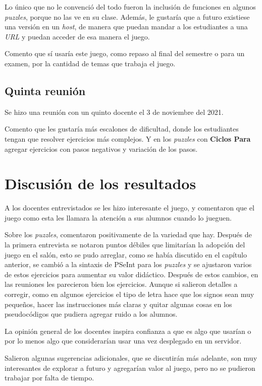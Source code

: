 Lo único que no le convenció del todo fueron la inclusión de funciones en algunos \textit{puzzles}, porque no las ve en su clase. Además, le gustaría que a futuro existiese una versión en un \textit{host}, de manera que puedan mandar a los estudiantes a una \textit{URL} y puedan acceder de esa manera el juego.

Comento que sí usaría este juego, como repaso al final del semestre o para un examen, por la cantidad de temas que trabaja el juego.

\subsection{Quinta reunión}
Se hizo una reunión con un quinto docente el 3 de noviembre del 2021.

Comento que les gustaría más escalones de dificultad, donde los estudiantes tengan que resolver ejercicios más complejos. Y en los \textit{puzzles} con \textbf{Ciclos Para} agregar ejercicios con pasos negativos y variación de los pasos.

\section{Discusión de los resultados}
A los docentes entrevistados se les hizo interesante el juego, y comentaron que el juego como esta les llamara la atención a sus alumnos cuando lo jueguen.

Sobre los \textit{puzzles}, comentaron positivamente de la variedad que hay. Después de la primera entrevista se notaron puntos débiles que limitarían la adopción del juego en el salón, esto se pudo arreglar, como se había discutido en el capítulo anterior, se cambió a la sintaxis de PSeInt para los \textit{puzzles} y se ajustaron varios de estos ejercicios para aumentar su valor didáctico. Después de estos cambios, en las reuniones les parecieron bien los ejercicios. Aunque si salieron detalles a corregir, como en algunos ejercicios el tipo de letra hace que los signos sean muy pequeños, hacer las instrucciones más claras y quitar algunas cosas en los pseudocódigos que pudiera agregar ruido a los alumnos.

La opinión general de los docentes inspira confianza a que es algo que usarían o por lo menos algo que considerarían usar una vez desplegado en un servidor.

Salieron algunas sugerencias adicionales, que se discutirán más adelante, son muy interesantes de explorar a futuro y agregarían valor al juego, pero no se pudieron trabajar por falta de tiempo.
